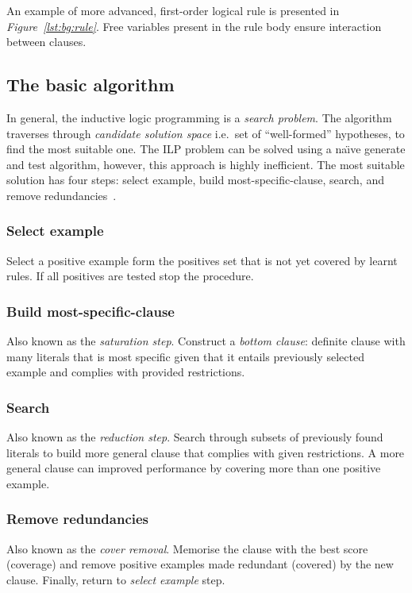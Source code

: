 \documentclass[10pt, a4paper, pdflatex, leqno, twoside, openright]{report}
\begin{document}
An example of more advanced, first-order logical rule is presented in \emph{Figure~\ref{lst:bg:rule}}. Free variables present in the rule body ensure interaction between clauses.

    \subsection{The basic algorithm}
In general, the inductive logic programming is a \emph{search problem}. The algorithm traverses through \emph{candidate solution space} i.e.\ set of ``well-formed'' hypotheses, to find the most suitable one. The ILP problem can be solved using a na\"{\i}ve generate and test algorithm, however, this approach is highly inefficient. The most suitable solution has four steps: select example, build most-specific-clause, search, and remove redundancies~\citep{muggleton1994inductive}.

      \subsubsection{Select example}
Select a positive example form the positives set that is not yet covered by learnt rules. If all positives are tested stop the procedure.

      \subsubsection{Build most-specific-clause}
Also known as the \emph{saturation step}. Construct a \emph{bottom clause}: definite clause with many literals that is most specific given that it entails previously selected example and complies with provided restrictions.

      \subsubsection{Search}
Also known as the \emph{reduction step}. Search through subsets of previously found literals to build more general clause that complies with given restrictions. A more general clause can improved performance by covering more than one positive example.

      \subsubsection{Remove redundancies}
Also known as the \emph{cover removal}. Memorise the clause with the best score (coverage) and remove positive examples made redundant (covered) by the new clause. Finally, return to \emph{select example} step.
\end{document}

